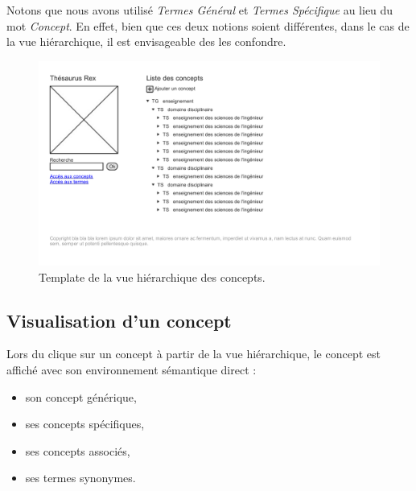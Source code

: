 Notons que nous avons utilisé \emph{Termes Général} et \emph{Termes Spécifique} au lieu du mot \emph{Concept}. En effet, bien que ces deux notions soient différentes, dans le cas de la vue hiérarchique, il est envisageable des les confondre.
\begin{figure}[H]
\begin{center}
\includegraphics[width=\textwidth]{files/template_concepts}
\end{center}
\caption{Template de la vue hiérarchique des concepts.}
\end{figure}

\subsection{Visualisation d'un concept}

Lors du clique sur un concept à partir de la vue hiérarchique, le concept est affiché avec son environnement sémantique direct :
\begin{itemize}
\item son concept générique,
\item ses concepts spécifiques,
\item ses concepts associés,
\item ses termes synonymes.
\end{itemize}

